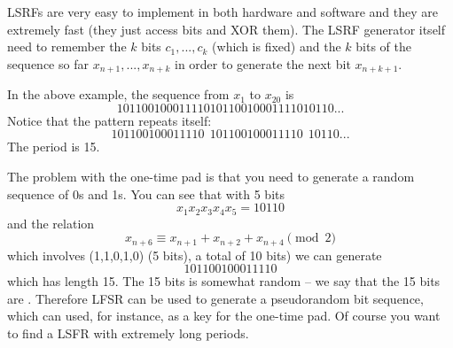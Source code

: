 LSRFs are very easy to implement in both hardware and software
and they are extremely fast
(they just access bits and XOR them).
The LSRF generator itself need to remember the $k$ bits
$c_1, ..., c_k$ (which is fixed)
and the $k$ bits of the sequence so far
$x_{n + 1}, ..., x_{n + k}$ in order to generate the next
bit $x_{n + k + 1}$.

\begin{comment}
x = [1,0,1,1,0]
c = [1,1,0,1,0]
# x_{n + 6} = 1x_{n+1} + 1x_{n+2} + 0x_{n+3} + 1x_{n+4} + 0x_{n+5}
def f(c, x):
    y = x[-5:]
    s = sum([a*b for (a,b) in zip(c,y)]) %
    x.append(s)

#print x
for i in range(1000):
    f(c, x)

found = False
y = None   
for length in range(1, 100):
    y = x[:length]
    z = x[length:]
    numtimes = 0
    while 1:
        y0 = z[:length]
        if y0 != y:
            break
        numtimes += 1
        z = z[length:]
        if len(z) < length:
            found = True
    if found: break

if found:
    print y
    print length
    print numtimes
\end{comment}

In the above example, the sequence from $x_1$ to $x_{20}$ is
\[
10110010001111010110010001111010110...
\]
Notice that the pattern repeats itself:
\[
101100100011110\ \ 101100100011110\ \ 10110...
\]
The period is 15.

The problem with the one-time pad is that you need to
generate a random sequence of 0s and 1s.
You can see that with 5 bits
\[
  x_1 x_2 x_3 x_4 x_5 = 10110
\]
and the relation
\[
  x_{n + 6} \equiv x_{n+1} + x_{n+2} + x_{n+4} \pmod{2}
\]
which involves (1,1,0,1,0) (5 bits), a total of 10 bits)  we can generate
\[
  101100100011110
\]
which has length 15.
The 15 bits is somewhat random -- we say that the 15 bits are
.
Therefore LFSR can be used to generate a pseudorandom bit sequence,
which can 
used, for instance, as a key for the one-time pad.
Of course you want to find a LSFR with extremely long periods.







